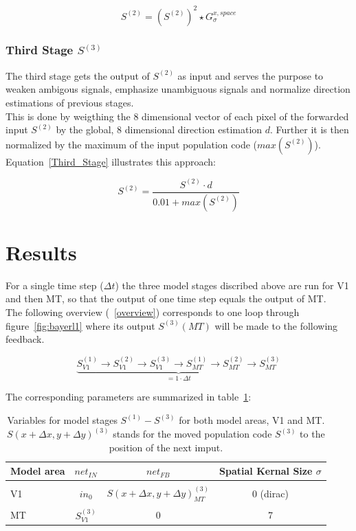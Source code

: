 \documentclass[a4paper]{article}
\begin{document}
\begin{equation}
S^{(2)}=(S^{(2)})^{2} \star G_{\sigma}^{x,space}
\label{Second_Stage}
\end{equation}

\subsubsection{Third Stage $S^{(3)}$}
The third stage gets the output of $S^{(2)}$ as input and serves the purpose to weaken ambigous signals, emphasize unambiguous signals and normalize direction estimations of previous stages.\\
This is done by weigthing the 8 dimensional vector of each pixel of the forwarded input $S^{(2)}$ by the global, 8 dimensional direction estimation $d$. Further it is then normalized by the maximum of the input population code ($max(S^{(2)})$).\\
Equation~\eqref{Third_Stage} illustrates this approach:

\begin{equation}
S^{(2)}=\frac{S^{(2)}\cdot d}{0.01+max(S^{(2)})}
\label{Third_Stage}
\end{equation}

\section{Results}

For a single time step ($\Delta t$) the three model stages discribed above are run for V1 and then MT, so that the output of one time step equals the output of MT.\\
The following overview (~\eqref{overview}) corresponds to one loop through figure~\ref{fig:bayerl1} where its output $S^{(3)}(MT)$ will be made to the following feedback.

\begin{equation}
\underbrace{S^{(1)}_{V1}\rightarrow S^{(2)}_{V1}\rightarrow S^{(3)}_{V1}\rightarrow S^{(1)}_{MT}\rightarrow S^{(2)}_{MT}\rightarrow S^{(3)}_{MT}}_{= 1 \cdot \Delta t}
\label{overview}
\end{equation}

The corresponding parameters are summarized in table~\ref{tab:variables}:

\begin{table}[ht]
\centering
\begin{tabular}{l|c c c}
	Model area & $net_{IN}$ & $net_{FB}$ & Spatial Kernal Size $\sigma$\\ \hline \hline\\
	V1 		  & $in_{0}$ & $S(x+\Delta x,y+\Delta y)^{(3)}_{MT}$ & 0 (dirac) \\ \\
	MT 		  & $S^{(3)}_{V1}$ & 0 & 7\\
\end{tabular}
\caption{Variables for model stages $S^{(1)}-S^{(3)}$ for both model areas, V1 and MT. $S(x+\Delta x, y+\Delta y)^{(3)}$ stands for the moved population code $S^{(3)}$ to the position of the next imput.}
\label{tab:variables}
\end{table}
\end{document}
